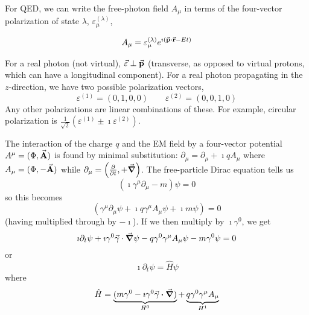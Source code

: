 \documentclass[a4paper,twoside,master.tex]{subfiles}
\begin{document}

For QED, we can write the free-photon field $ A_{\mu} $ in terms of the four-vector polarization of state $ \lambda $, $ \varepsilon_{\mu}^{(\lambda)} $,

\begin{equation}
    A_{\mu} = \varepsilon_{\mu}^{(\lambda)} e^{\imath (\va{p} \vdot \va{r} - Et)}
\end{equation}

For a real photon (not virtual), $ \va{\varepsilon} \perp \va{p} $ (transverse, as opposed to virtual protons, which can have a longitudinal component). For a real photon propagating in the $ z $-direction, we have two possible polarization vectors,
\begin{equation}
    \varepsilon^{(1)} = (0,1,0,0) \qquad \varepsilon^{(2)} = (0,0,1,0)
\end{equation}
Any other polarizations are linear combinations of these. For example, circular polarization is $ \frac{1}{\sqrt{2}}(\varepsilon^{(1)} \pm \imath \varepsilon^{(2)}) $.

The interaction of the charge $ q $ and the EM field by a four-vector potential $ A^{\mu} = (\Phi, \va{A}) $ is found by minimal substitution: $ \partial_{\mu} = \partial_{\mu} + \imath q A_{\mu} $ where $ A_{\mu} = (\Phi, - \va{A}) $ while $ \partial_{\mu} = \left( \pdv{t}, + \grad \right) $. The free-particle Dirac equation tells us
\begin{equation}
    (\imath \gamma^{\mu} \partial_{\mu} - m) \psi = 0
\end{equation}
so this becomes
\begin{equation}
    (\gamma^{\mu} \partial_{\mu} \psi + \imath q \gamma^{\mu} A_{\mu} \psi + \imath m \psi) = 0
\end{equation}
(having multiplied through by $ -\imath $). If we then multiply by $ \imath \gamma^0 $, we get
\begin{equation}
    \imath \partial_t \psi + \imath \gamma^0 \va{\gamma} \cdot \grad{\psi} - q \gamma^0 \gamma^{\mu} A_{\mu} \psi - m \gamma^0 \psi = 0
\end{equation}
or
\begin{equation}
    \imath \partial_t \psi = \hat{H} \psi
\end{equation}
where
\begin{equation}
    \hat{H} = \underbrace{(m \gamma^0 - \imath \gamma^0 \va{\gamma} \vdot \grad)}_{H^0} + \underbrace{q \gamma^0 \gamma^{\mu} A_{\mu}}_{H^1}
\end{equation}
\end{document}
